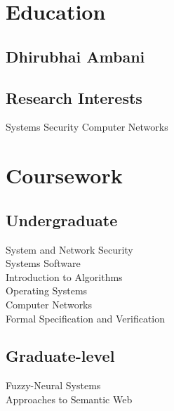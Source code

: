 \documentclass[]{deedy}
\begin{document}



\begin{minipage}[t]{0.33\textwidth} 

\section{Education}
\subsection{Dhirubhai Ambani}
\sectionsep

\subsection{Research Interests}
Systems Security \textbullet{} Computer Networks

\section{Coursework}
\subsection{Undergraduate}
System and Network Security \\
Systems Software \\
Introduction to Algorithms \\
Operating Systems \\
Computer Networks \\
Formal Specification and Verification
\sectionsep

\subsection{Graduate-level}
Fuzzy-Neural Systems \\
Approaches to Semantic Web \\
\sectionsep


\end{minipage}
\end{document}
